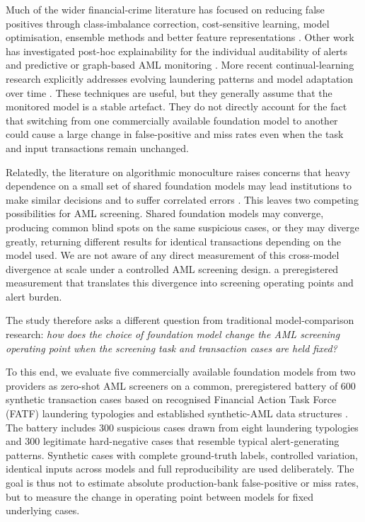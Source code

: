 \documentclass[pdflatex,sn-basic,Numbered]{sn-jnl}
\newcommand{\HLtext}[1]{\texthl{#1}}
\newcommand{\HLdel}[1]{\textcolor{HLink}{\sout{#1}}}
\renewcommand{\HLtext}[1]{#1}\renewcommand{\HLdel}[1]{#1}%
\begin{document}
Much of the wider financial-crime literature has focused on reducing false positives through class-imbalance correction, cost-sensitive learning, model optimisation, ensemble methods and better feature representations \cite{alhashedi,smote,goecks,imbalance}. Other work has investigated post-hoc explainability for the individual auditability of alerts \cite{shap,lime} and predictive or graph-based AML monitoring \cite{jullum,pourhabibi}. More recent continual-learning research explicitly addresses evolving laundering patterns and model adaptation over time \cite{deprez}. These techniques are useful, but they generally assume that the monitored model is a stable artefact. They do not directly account for the fact that switching from one commercially available foundation model to another could cause a large change in false-positive and miss rates even when the task and input transactions remain unchanged.

Relatedly, the literature on algorithmic monoculture raises concerns that heavy dependence on a small set of shared foundation models may lead institutions to make similar decisions and to suffer correlated errors \cite{homogenization,leviathan,monoculture}. This leaves two competing possibilities for AML screening. Shared foundation models may converge, producing common blind spots on the same suspicious cases, or they may diverge greatly, returning different results for identical transactions depending on the model used. We are not aware of \HLdel{any direct measurement of this cross-model divergence at scale under a controlled AML screening design.} \HLtext{a preregistered measurement that translates this divergence into screening operating points and alert burden.}

The study therefore asks a different question from traditional model-comparison research: \emph{how does the choice of foundation model change the AML screening operating point when the screening task and transaction cases are held fixed?}

To this end, we evaluate five commercially available foundation models from two providers as zero-shot AML screeners on a common, preregistered battery of 600 synthetic transaction cases based on recognised Financial Action Task Force (FATF) laundering typologies and established synthetic-AML data structures \cite{samld,weber2018}. The battery includes 300 suspicious cases drawn from eight laundering typologies and 300 legitimate hard-negative cases that resemble typical alert-generating patterns. Synthetic cases with complete ground-truth labels, controlled variation, identical inputs across models and full reproducibility are used deliberately. The goal is thus not to estimate absolute production-bank false-positive or miss rates, but to measure the change in operating point between models for fixed underlying cases.
\end{document}
